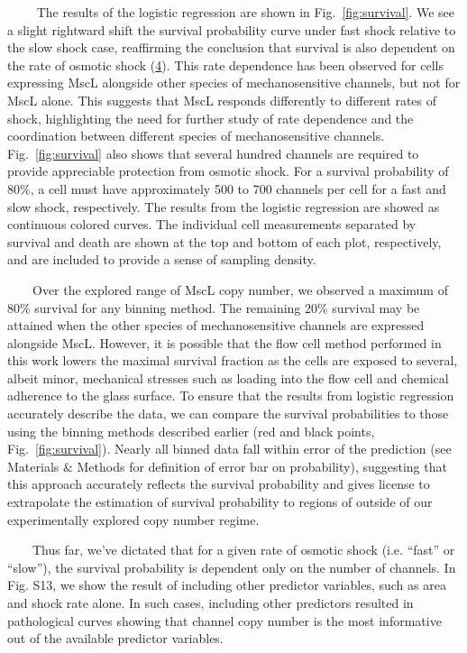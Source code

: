 ~~~~
The
results
of the
logistic
regression
are
shown
in
Fig.~\ref{fig:survival}.
We see
a
slight
rightward
shift
the
survival
probability
curve
under
fast
shock
relative
to the
slow
shock
case,
reaffirming
the
conclusion
that
survival
is
also
dependent
on the
rate
of
osmotic
shock
(\protect\hyperlink{ref-bialecka-fornal2015}{4}).
This
rate
dependence
has
been
observed
for
cells
expressing
MscL
alongside
other
species
of
mechanosensitive
channels,
but
not
for
MscL
alone.
This
suggests
that
MscL
responds
differently
to
different
rates
of
shock,
highlighting
the
need
for
further
study
of
rate
dependence
and
the
coordination
between
different
species
of
mechanosensitive
channels.
Fig.~\ref{fig:survival}
also
shows
that
several
hundred
channels
are
required
to
provide
appreciable
protection
from
osmotic
shock.
For a
survival
probability
of
80\%,
a cell
must
have
approximately
500 to
700
channels
per
cell
for a
fast
and
slow
shock,
respectively.
The
results
from
the
logistic
regression
are
showed
as
continuous
colored
curves.
The
individual
cell
measurements
separated
by
survival
and
death
are
shown
at the
top
and
bottom
of
each
plot,
respectively,
and
are
included
to
provide
a
sense
of
sampling
density.

~~~~Over
the
explored
range
of
MscL
copy
number,
we
observed
a
maximum
of
80\%
survival
for
any
binning
method.
The
remaining
20\%
survival
may be
attained
when
the
other
species
of
mechanosensitive
channels
are
expressed
alongside
MscL.
However,
it is
possible
that
the
flow
cell
method
performed
in
this
work
lowers
the
maximal
survival
fraction
as the
cells
are
exposed
to
several,
albeit
minor,
mechanical
stresses
such
as
loading
into
the
flow
cell
and
chemical
adherence
to the
glass
surface.
To
ensure
that
the
results
from
logistic
regression
accurately
describe
the
data,
we can
compare
the
survival
probabilities
to
those
using
the
binning
methods
described
earlier
(red
and
black
points,
Fig.~\ref{fig:survival}).
Nearly
all
binned
data
fall
within
error
of the
prediction
(see
Materials
\&
Methods
for
definition
of
error
bar on
probability),
suggesting
that
this
approach
accurately
reflects
the
survival
probability
and
gives
license
to
extrapolate
the
estimation
of
survival
probability
to
regions
of
outside
of our
experimentally
explored
copy
number
regime.

~~~~Thus
far,
we've
dictated
that
for a
given
rate
of
osmotic
shock
(i.e.
``fast''
or
``slow''),
the
survival
probability
is
dependent
only
on the
number
of
channels.
In
Fig.
S13,
we
show
the
result
of
including
other
predictor
variables,
such
as
area
and
shock
rate
alone.
In
such
cases,
including
other
predictors
resulted
in
pathological
curves
showing
that
channel
copy
number
is the
most
informative
out of
the
available
predictor
variables.

